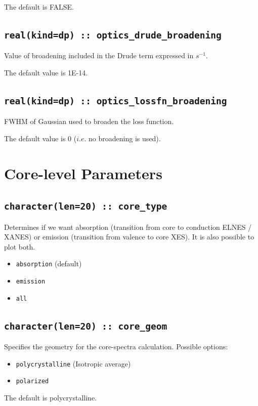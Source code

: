 \documentclass[a4paper,11pt,twoside]{book}
\begin{document}
{The default is FALSE.

\subsection[optics\_drude\_broadening]{\tt real(kind=dp) :: optics\_drude\_broadening}
Value of broadening included in the Drude term expressed in $s^{-1}$.

The default value is 1E-14.

\subsection[optics\_lossfn\_broadening]{\tt real(kind=dp) :: optics\_lossfn\_broadening}
FWHM of Gaussian used to broaden the loss function.

The default value is 0 ($i.e.$ no broadening is used).


\section{Core-level Parameters}

\subsection[core\_geom]{\tt character(len=20) :: core\_type}

Determines if we want absorption (transition from core to conduction
ELNES / XANES)
or emission (transition from valence to core XES). It is also possible
to plot both.
\begin{itemize}
\item[{\bf --}]  \verb#absorption# (default)
\item[{\bf --}]  \verb#emission#
\item[{\bf --}]  \verb#all#
\end{itemize}

\subsection[core\_geom]{\tt character(len=20) :: core\_geom}

Specifies the geometry for the core-spectra calculation.  Possible options:
\begin{itemize}
\item[{\bf --}]  \verb#polycrystalline# (Isotropic average)
\item[{\bf --}]  \verb#polarized#
\end{itemize}
The default is polycrystalline.

}
\end{document}
